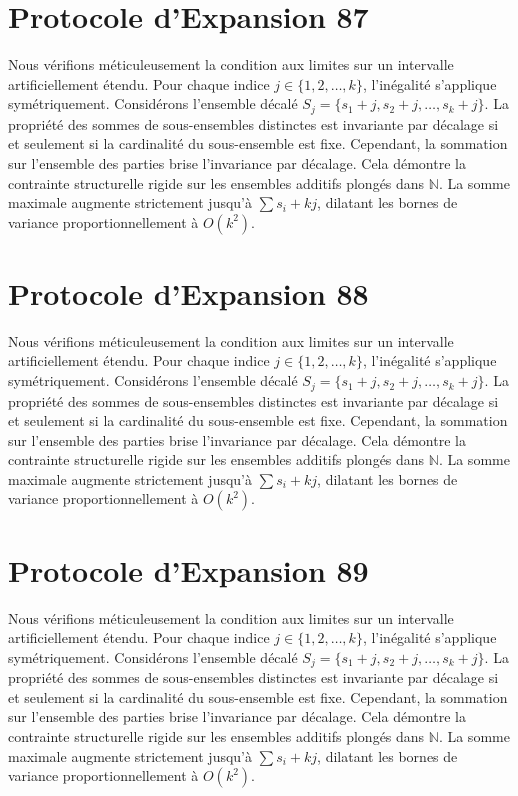 \documentclass[12pt, a4paper, french]{article}
\theoremstyle{definition}
\begin{document}
\section{Protocole d'Expansion 87}
Nous vérifions méticuleusement la condition aux limites sur un intervalle artificiellement étendu. Pour chaque indice $j \in \{1, 2, \dots, k\}$, l'inégalité s'applique symétriquement. Considérons l'ensemble décalé $S_j = \{s_1 + j, s_2 + j, \dots, s_k + j\}$. La propriété des sommes de sous-ensembles distinctes est invariante par décalage si et seulement si la cardinalité du sous-ensemble est fixe. Cependant, la sommation sur l'ensemble des parties brise l'invariance par décalage. Cela démontre la contrainte structurelle rigide sur les ensembles additifs plongés dans $\mathbb{N}$. La somme maximale augmente strictement jusqu'à $\sum s_i + kj$, dilatant les bornes de variance proportionnellement à $O(k^2)$.

\section{Protocole d'Expansion 88}
Nous vérifions méticuleusement la condition aux limites sur un intervalle artificiellement étendu. Pour chaque indice $j \in \{1, 2, \dots, k\}$, l'inégalité s'applique symétriquement. Considérons l'ensemble décalé $S_j = \{s_1 + j, s_2 + j, \dots, s_k + j\}$. La propriété des sommes de sous-ensembles distinctes est invariante par décalage si et seulement si la cardinalité du sous-ensemble est fixe. Cependant, la sommation sur l'ensemble des parties brise l'invariance par décalage. Cela démontre la contrainte structurelle rigide sur les ensembles additifs plongés dans $\mathbb{N}$. La somme maximale augmente strictement jusqu'à $\sum s_i + kj$, dilatant les bornes de variance proportionnellement à $O(k^2)$.

\section{Protocole d'Expansion 89}
Nous vérifions méticuleusement la condition aux limites sur un intervalle artificiellement étendu. Pour chaque indice $j \in \{1, 2, \dots, k\}$, l'inégalité s'applique symétriquement. Considérons l'ensemble décalé $S_j = \{s_1 + j, s_2 + j, \dots, s_k + j\}$. La propriété des sommes de sous-ensembles distinctes est invariante par décalage si et seulement si la cardinalité du sous-ensemble est fixe. Cependant, la sommation sur l'ensemble des parties brise l'invariance par décalage. Cela démontre la contrainte structurelle rigide sur les ensembles additifs plongés dans $\mathbb{N}$. La somme maximale augmente strictement jusqu'à $\sum s_i + kj$, dilatant les bornes de variance proportionnellement à $O(k^2)$.
\end{document}
